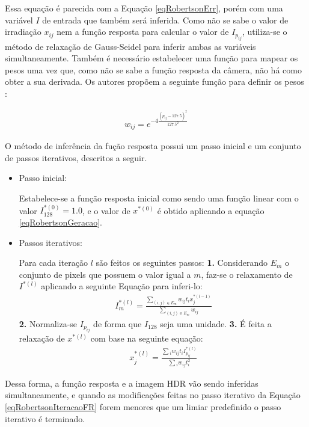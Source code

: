 Essa equação é parecida com a Equação \ref{eqRobertsonErr}, porém com uma variável $I$ de entrada que também será inferida. Como não se sabe o valor de irradiação $x_{ij}$ nem a função resposta para calcular o valor de $I_{p_{ij}}$, utiliza-se o método de relaxação de Gauss-Seidel para inferir ambas as variáveis simultaneamente. Também é necessário estabelecer uma função para mapear os pesos uma vez que, como não se sabe a função resposta da câmera, não há como obter a sua derivada. Os autores propõem a seguinte função para definir os pesos \cite{robertson2}:

\begin{align} \label{eqRobertsonErr3}
	w_{ij} = e^{-4\frac{(p_{ij}-127.5)^2}{127.5^2}}
\end{align}

O método de inferência da fução resposta possui um passo inicial e um conjunto de passos iterativos, descritos a seguir.

\begin{itemize}
\item Passo inicial:

Estabelece-se a função resposta inicial como sendo uma função linear com o valor $I_{128}^{*(0)} = 1.0$, e o valor de $x^{*(0)}$ é obtido aplicando a equação \ref{eqRobertsonGeracao}.

\item Passos iterativos:

Para cada iteração $l$ são feitos os seguintes passos:
\subitem \textbf{1.} Considerando $E_m$ o conjunto de pixels que possuem o valor igual a $m$, faz-se o relaxamento de $I^{*(l)}$ aplicando a seguinte Equação para inferi-lo:
\begin{align} \label{eqRobertsonIteracaoFR}
	I^{*(l)}_m = \frac{\sum\limits_{(i,j) \in E_m}{w_{ij}t_{i}x_{j}^{*(l-1)}}}{\sum\limits_{(i,j) \in E_m}{w_{ij}}}
\end{align}
\subitem \textbf{2.} Normaliza-se $I_{p_{ij}}$ de forma que $I_{128}$ seja uma unidade.
\subitem \textbf{3.} É feita a relaxação de $x^{*(l)}$ com base na seguinte equação:
\begin{align} \label{eqRobertsonIteracaoHDR}
	x^{*(l)}_j = \frac{\sum{_i w_{ij}t_{i}I^{*(l)}_{p_{ij}}}}{\sum{_i w_{ij}t_{i}^2}}
\end{align}
\end{itemize}

Dessa forma, a função resposta e a imagem HDR vão sendo inferidas simultaneamente, e quando as modificações feitas no passo iterativo da Equação \ref{eqRobertsonIteracaoFR} forem menores que um limiar predefinido o passo iterativo é terminado.

